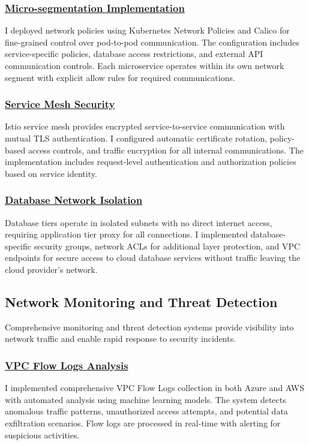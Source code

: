 \subsubsection*{\underline{Micro-segmentation Implementation}}
I deployed network policies using Kubernetes Network Policies and Calico for fine-grained control over pod-to-pod communication. The configuration includes service-specific policies, database access restrictions, and external API communication controls. Each microservice operates within its own network segment with explicit allow rules for required communications.

\subsubsection*{\underline{Service Mesh Security}}
Istio service mesh provides encrypted service-to-service communication with mutual TLS authentication. I configured automatic certificate rotation, policy-based access controls, and traffic encryption for all internal communications. The implementation includes request-level authentication and authorization policies based on service identity.

\subsubsection*{\underline{Database Network Isolation}}
Database tiers operate in isolated subnets with no direct internet access, requiring application tier proxy for all connections. I implemented database-specific security groups, network ACLs for additional layer protection, and VPC endpoints for secure access to cloud database services without traffic leaving the cloud provider's network.

\subsection{Network Monitoring and Threat Detection}
Comprehensive monitoring and threat detection systems provide visibility into network traffic and enable rapid response to security incidents.

\subsubsection*{\underline{VPC Flow Logs Analysis}}
I implemented comprehensive VPC Flow Logs collection in both Azure and AWS with automated analysis using machine learning models. The system detects anomalous traffic patterns, unauthorized access attempts, and potential data exfiltration scenarios. Flow logs are processed in real-time with alerting for suspicious activities.

